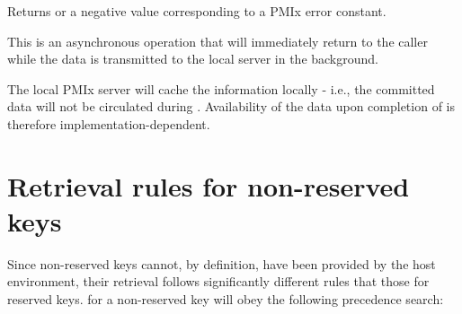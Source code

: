 Returns  or a negative value corresponding to a PMIx error constant.

\descr

This is an asynchronous operation that will immediately return to the caller while the data is transmitted to the local server in the background.

\adviceuserstart
The local PMIx server will cache the information locally - i.e., the committed data will not be circulated during .
Availability of the data upon completion of  is therefore implementation-dependent.
\adviceuserend


\section{Retrieval rules for non-reserved keys}

Since non-reserved keys cannot, by definition, have been provided by the host
environment, their retrieval follows significantly different rules that those
for reserved keys.  for a non-reserved key will obey the
following precedence search:

